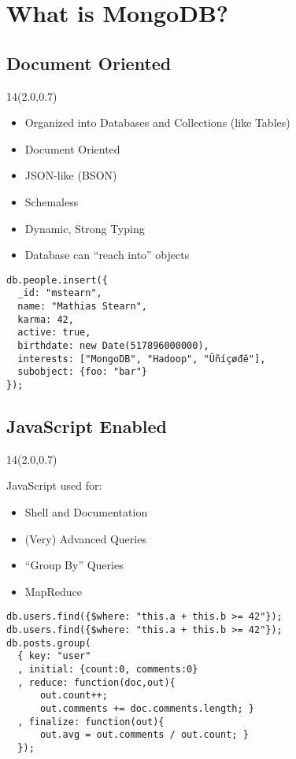 \documentclass{beamer}
\newcommand{\MongoLogo}{
\begin{textblock}{14}(2.0,0.7)
  \pgfuseimage{logo}
\end{textblock}
}
\begin{document}
\section{What is MongoDB?}
\subsection{Document Oriented}
\begin{frame}[fragile]
  \MongoLogo
  \begin{itemize}
    \item Organized into Databases and Collections (like Tables)
    \item Document Oriented
    \item JSON-like (BSON)
    \item Schemaless
    \item Dynamic, Strong Typing
    \item Database can ``reach into'' objects
  \end{itemize}

  \begin{small}
  \begin{verbatim}
db.people.insert({
  _id: "mstearn",
  name: "Mathias Stearn",
  karma: 42,
  active: true,
  birthdate: new Date(517896000000),
  interests: ["MongoDB", "Hadoop", "Üñíçøđĕ"],
  subobject: {foo: "bar"}
});
  \end{verbatim}
  \end{small}

\end{frame}

\subsection{JavaScript Enabled}
\begin{frame}[fragile]
  \MongoLogo
  JavaScript used for:
  \begin{itemize}
    \item Shell and Documentation
    \item (Very) Advanced Queries
    \item ``Group By'' Queries
    \item MapReduce
  \end{itemize}

  \begin{verbatim}
db.users.find({$where: "this.a + this.b >= 42"});
db.users.find({$where: "this.a + this.b >= 42"});
db.posts.group(
  { key: "user"
  , initial: {count:0, comments:0}
  , reduce: function(doc,out){
      out.count++;
      out.comments += doc.comments.length; }
  , finalize: function(out){ 
      out.avg = out.comments / out.count; }
  });
  \end{verbatim}
\end{frame}
\end{document}
